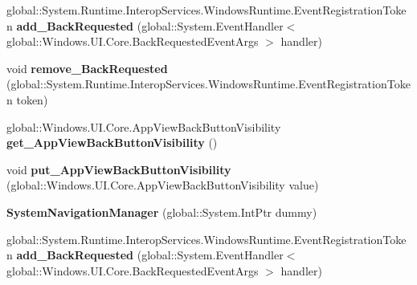 \begin{DoxyCompactItemize}
global\+::\+System.\+Runtime.\+Interop\+Services.\+Windows\+Runtime.\+Event\+Registration\+Token {\bfseries add\+\_\+\+Back\+Requested} (global\+::\+System.\+Event\+Handler$<$ global\+::\+Windows.\+U\+I.\+Core.\+Back\+Requested\+Event\+Args $>$ handler)
\item 
\mbox{\label{class_windows_1_1_u_i_1_1_core_1_1_system_navigation_manager_abf606a807ad7581e8b10c99338d9221a}} 
void {\bfseries remove\+\_\+\+Back\+Requested} (global\+::\+System.\+Runtime.\+Interop\+Services.\+Windows\+Runtime.\+Event\+Registration\+Token token)
\item 
\mbox{\label{class_windows_1_1_u_i_1_1_core_1_1_system_navigation_manager_a3aa076218316c5f742b0c8611394df04}} 
global\+::\+Windows.\+U\+I.\+Core.\+App\+View\+Back\+Button\+Visibility {\bfseries get\+\_\+\+App\+View\+Back\+Button\+Visibility} ()
\item 
\mbox{\label{class_windows_1_1_u_i_1_1_core_1_1_system_navigation_manager_afe04efb626cf6de6a695ea8debc94023}} 
void {\bfseries put\+\_\+\+App\+View\+Back\+Button\+Visibility} (global\+::\+Windows.\+U\+I.\+Core.\+App\+View\+Back\+Button\+Visibility value)
\item 
\mbox{\label{class_windows_1_1_u_i_1_1_core_1_1_system_navigation_manager_ae4d0015a9d24d73ac2ebcf8019f386b2}} 
{\bfseries System\+Navigation\+Manager} (global\+::\+System.\+Int\+Ptr dummy)
\item 
\mbox{\label{class_windows_1_1_u_i_1_1_core_1_1_system_navigation_manager_a505f794c14a0da8cd15a31aa6273a6d7}} 
global\+::\+System.\+Runtime.\+Interop\+Services.\+Windows\+Runtime.\+Event\+Registration\+Token {\bfseries add\+\_\+\+Back\+Requested} (global\+::\+System.\+Event\+Handler$<$ global\+::\+Windows.\+U\+I.\+Core.\+Back\+Requested\+Event\+Args $>$ handler)
\item 
\mbox{\label{class_windows_1_1_u_i_1_1_core_1_1_system_navigation_manager_abf606a807ad7581e8b10c99338d9221a}} 

\end{DoxyCompactItemize}
